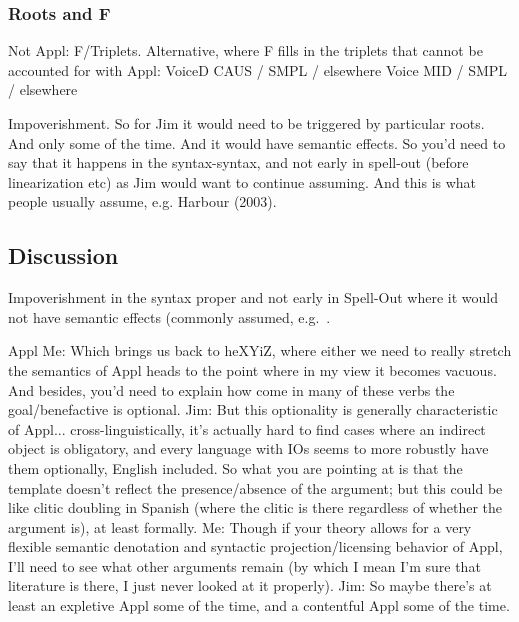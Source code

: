 		\subsubsection{Roots and F}

Not Appl: F/Triplets.
Alternative, where F fills in the triplets that cannot be accounted for with Appl:
Voice{D} \lra CAUS / 
				\lra SMPL / elsewhere
Voice{} \lra MID / 
				\lra SMPL / elsewhere


Impoverishment.
	So for Jim it would need to be triggered by particular roots.
	And only some of the time.
	And it would have semantic effects.
	So you'd need to say that it happens in the syntax-syntax, and not early in spell-out (before linearization etc) as Jim would want to continue assuming. And this is what people usually assume, e.g. Harbour (2003).
	
	
	\subsection{Discussion} \label{aas:jim:cons}
Impoverishment in the syntax proper and not early in Spell-Out where it would not have semantic effects (commonly assumed, e.g.~\citealt{harbour03}.


Appl
Me: Which brings us back to heXYiZ, where either we need to really stretch the semantics of Appl heads to the point where in my view it becomes vacuous. And besides, you'd need to explain how come in many of these verbs the goal/benefactive is optional.
	Jim: But this optionality is generally characteristic of Appl... cross-linguistically, it's actually hard to find cases where an indirect object is obligatory, and every language with IOs seems to more robustly have them optionally, English included. So what you are pointing at is that the template doesn't reflect the presence/absence of the argument; but this could be like clitic doubling in Spanish (where the clitic is there regardless of whether the argument is), at least formally. 
	Me: Though if your theory allows for a very flexible semantic denotation and syntactic projection/licensing behavior of Appl, I'll need to see what other arguments remain (by which I mean I'm sure that literature is there, I just never looked at it properly).
Jim: So maybe there's at least an expletive Appl some of the time, and a contentful Appl some of the time.


